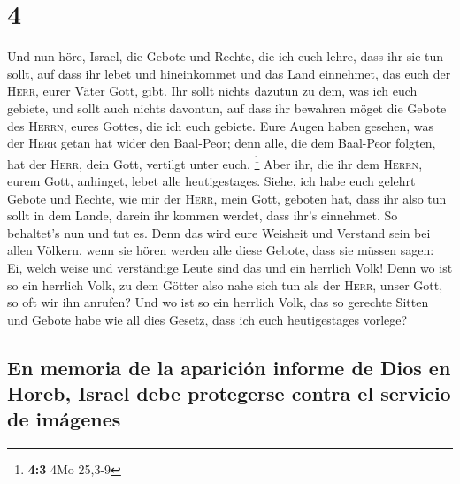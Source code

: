 \hypertarget{section-3}{%
\section{4}\label{section-3}}

 Und nun höre, Israel, die Gebote und Rechte, die ich euch
lehre, dass ihr sie tun sollt, auf dass ihr lebet und hineinkommet und
das Land einnehmet, das euch der \textsc{Herr}, eurer Väter Gott, gibt.
 Ihr sollt nichts dazutun zu dem, was ich euch gebiete,
und sollt auch nichts davontun, auf dass ihr bewahren möget die Gebote
des \textsc{Herrn}, eures Gottes, die ich euch gebiete. 
Eure Augen haben gesehen, was der \textsc{Herr} getan hat wider den
Baal-Peor; denn alle, die dem Baal-Peor folgten, hat der \textsc{Herr},
dein Gott, vertilgt unter euch. \footnote{\textbf{4:3} 4Mo 25,3-9}
 Aber ihr, die ihr dem \textsc{Herrn}, eurem Gott,
anhinget, lebet alle heutigestages.  Siehe, ich habe euch
gelehrt Gebote und Rechte, wie mir der \textsc{Herr}, mein Gott, geboten
hat, dass ihr also tun sollt in dem Lande, darein ihr kommen werdet,
dass ihr's einnehmet.  So behaltet's nun und tut es. Denn
das wird eure Weisheit und Verstand sein bei allen Völkern, wenn sie
hören werden alle diese Gebote, dass sie müssen sagen: Ei, welch weise
und verständige Leute sind das und ein herrlich Volk! 
Denn wo ist so ein herrlich Volk, zu dem Götter also nahe sich tun als
der \textsc{Herr}, unser Gott, so oft wir ihn anrufen? 
Und wo ist so ein herrlich Volk, das so gerechte Sitten und Gebote habe
wie all dies Gesetz, dass ich euch heutigestages vorlege?

\hypertarget{en-memoria-de-la-apariciuxf3n-informe-de-dios-en-horeb-israel-debe-protegerse-contra-el-servicio-de-imuxe1genes}{%
\subsection{En memoria de la aparición informe de Dios en Horeb, Israel
debe protegerse contra el servicio de
imágenes}\label{en-memoria-de-la-apariciuxf3n-informe-de-dios-en-horeb-israel-debe-protegerse-contra-el-servicio-de-imuxe1genes}}


